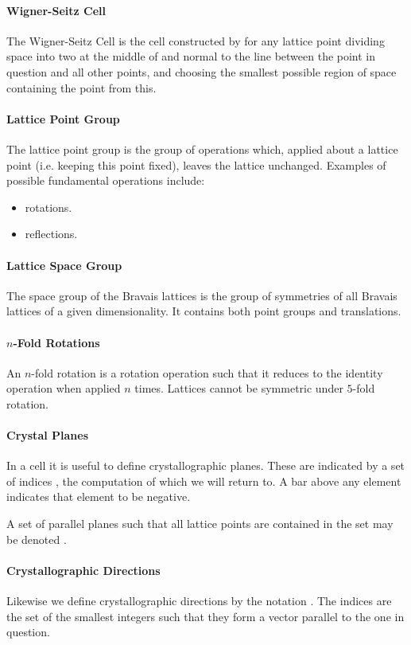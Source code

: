\paragraph{Wigner-Seitz Cell}
The Wigner-Seitz Cell is the cell constructed by for any lattice point dividing space into two at the middle of and normal to the line between the point in question and all other points, and choosing the smallest possible region of space containing the point from this.

\paragraph{Lattice Point Group}
The lattice point group is the group of operations which, applied about a lattice point (i.e. keeping this point fixed), leaves the lattice unchanged. Examples of possible fundamental operations include:
\begin{itemize}
	\item rotations.
	\item reflections.
\end{itemize}

\paragraph{Lattice Space Group}
The space group of the Bravais lattices is the group of symmetries of all Bravais lattices of a given dimensionality. It contains both point groups and translations.

\paragraph{$n$-Fold Rotations}
An $n$-fold rotation is a rotation operation such that it reduces to the identity operation when applied $n$ times. Lattices cannot be symmetric under $5$-fold rotation.

\paragraph{Crystal Planes}
In a cell it is useful to define crystallographic planes. These are indicated by a set of indices , the computation of which we will return to. A bar above any element indicates that element to be negative.

A set of parallel planes such that all lattice points are contained in the set may be denoted .

\paragraph{Crystallographic Directions}
Likewise we define crystallographic directions by the notation . The indices are the set of the smallest integers such that they form a vector parallel to the one in question.

